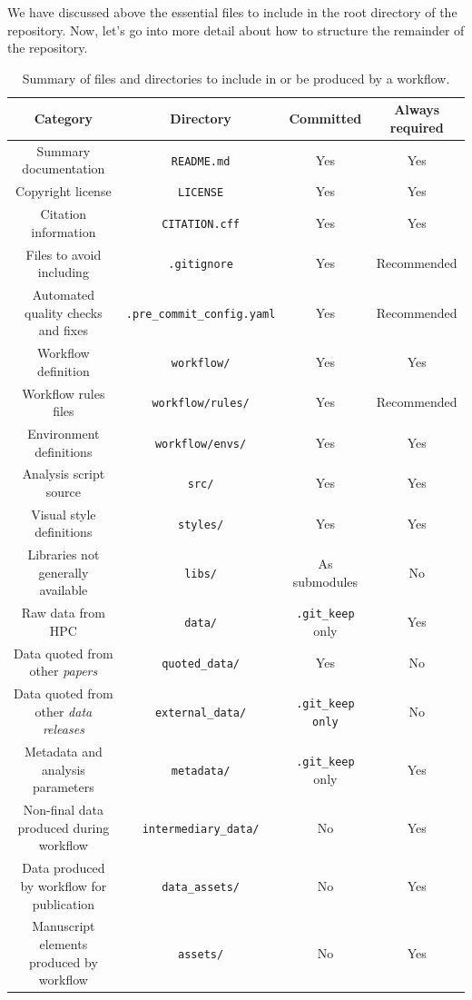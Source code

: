 \documentclass{article}
\newcommand\filename[1]{\texttt{#1}\xspace}
\begin{document}
We have discussed above the essential files to include in the root directory of the repository.
Now,
let's go into more detail about how to structure the remainder of the repository.

\begin{table}
  \centering
  \caption{\label{tab:workflow-summary}Summary of files and directories to include in or be produced by a workflow.}
  \begin{tabular}{cccc}
    Category & Directory & Committed & Always required\\
    \hline
    Summary documentation & \filename{README.md} & Yes & Yes \\
    Copyright license & \filename{LICENSE} & Yes & Yes \\
    Citation information & \filename{CITATION.cff} & Yes & Yes \\
    Files to avoid including & \filename{.gitignore} & Yes & Recommended \\
    Automated quality checks and fixes & \filename{.pre\_commit\_config.yaml} & Yes & Recommended \\
    Workflow definition & \filename{workflow/} & Yes & Yes \\
    Workflow rules files & \filename{workflow/rules/} & Yes & Recommended \\
    Environment definitions & \filename{workflow/envs/} & Yes & Yes \\
    Analysis script source & \filename{src/} & Yes & Yes \\
    Visual style definitions & \filename{styles/} & Yes & Yes \\
    Libraries not generally available & \filename{libs/} & As submodules & No \\
    Raw data from HPC & \filename{data/} & \filename{.git\_keep} only & Yes \\
    Data quoted from other \emph{papers} & \filename{quoted\_data/} & Yes & No \\
    Data quoted from other \emph{data releases} & \filename{external\_data/} & \filename{.git\_keep only} & No \\
    Metadata and analysis parameters & \filename{metadata/} & \filename{.git\_keep} only & Yes \\
    Non-final data produced during workflow & \filename{intermediary\_data/} & No & Yes\\
    Data produced by workflow for publication & \filename{data\_assets/} & No & Yes\\
    Manuscript elements produced by workflow & \filename{assets/} & No & Yes
  \end{tabular}
\end{table}
    
\end{document}
